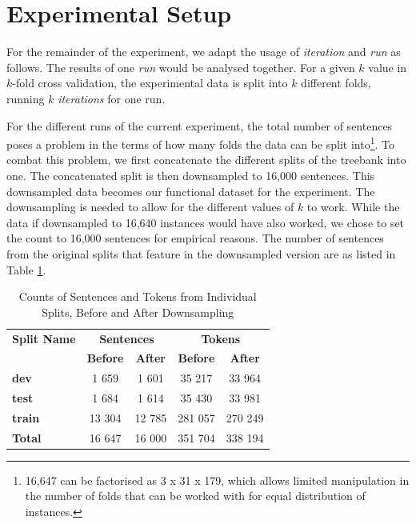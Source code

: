 \section{Experimental Setup}
\label{preprocess:lisca}

For the remainder of the experiment, we adapt the usage of \textit{iteration} and \textit{run} as follows. The results of one \textit{run} would be analysed together. For a given \(k\) value in \(k\)-fold cross validation, the experimental data is split into \(k\) different folds, running \(k\) \textit{iterations} for one run. 

For the different runs of the current experiment, the total number of sentences poses a problem in the terms of how many folds the data can be split into\footnote{16,647 can be factorised as 3 x 31 x 179, which allows limited manipulation in the number of folds that can be worked with for equal distribution of instances.}. To combat this problem, we first concatenate the different splits of the treebank into one. The concatenated split is then downsampled to 16,000 sentences. This downsampled data becomes our functional dataset for the experiment. The downsampling is needed to allow for the different values of \(k\) to work. While the data if downsampled to 16,640 instances would have also worked, we chose to set the count to 16,000 sentences for empirical reasons. The number of sentences from the original splits that feature in the downsampled version are as listed in Table \ref{tab:split_lisca_downsample}.

\begin{table}[h]
    \centering
    \begin{tabular}{|l||c|c||c|c|}
    \hline
    \multicolumn{1}{|c||}{\textbf{Split Name}} &
    \multicolumn{2}{c||}{\textbf{Sentences}} &
    \multicolumn{2}{c|}{\textbf{Tokens}}\\
     & \textbf{Before} & \textbf{After} & \textbf{Before} & \textbf{After}\\
    \hline
    \textbf{dev} & 1 659 & 1 601 & 35 217 & 33 964\\
    \textbf{test} & 1 684 & 1 614 & 35 430 & 33 981\\
    \textbf{train} & 13 304 & 12 785 & 281 057 & 270 249\\
    \hline
    \hline
    \textbf{Total} & 16 647 & 16 000 & 351 704 & 338 194\\  
    \hline
    \end{tabular}
    \caption{Counts of Sentences and Tokens from Individual Splits, Before and After Downsampling}
    \label{tab:split_lisca_downsample}
\end{table}


